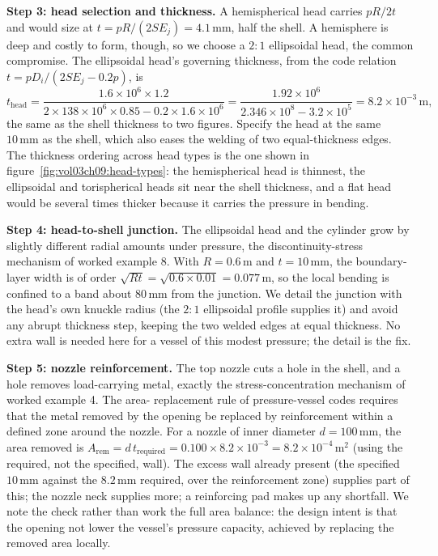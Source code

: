\textbf{Step 3: head selection and thickness.} A hemispherical head
carries $pR/2t$ and would size at $t = pR/(2 S E_j) = 4.1\,\si{
\milli\meter}$, half the shell. A hemisphere is deep and costly to
form, though, so we choose a $2{:}1$ ellipsoidal head, the common
compromise. The ellipsoidal head's governing thickness, from the code
relation $t = pD_i/(2 S E_j - 0.2 p)$, is
\[
t_{\text{head}} = \frac{1.6\times 10^6\times 1.2}
{2\times 138\times 10^6\times 0.85 - 0.2\times 1.6\times 10^6}
= \frac{1.92\times 10^6}{2.346\times 10^8 - 3.2\times 10^5}
= 8.2\times 10^{-3}\,\text{m},
\]
the same as the shell thickness to two figures. Specify the head at the same
$10\,\si{\milli\meter}$ as the shell, which also eases the welding of
two equal-thickness edges. The thickness ordering across head types is
the one shown in figure~\ref{fig:vol03ch09:head-types}: the
hemispherical head is thinnest, the ellipsoidal and torispherical heads
sit near the shell thickness, and a flat head would be several times
thicker because it carries the pressure in bending.



\textbf{Step 4: head-to-shell junction.} The ellipsoidal head and the
cylinder grow by slightly different radial amounts under pressure, the
discontinuity-stress mechanism of worked example 8. With $R = 0.6\,
\si{\meter}$ and $t = 10\,\si{\milli\meter}$, the boundary-layer width
is of order $\sqrt{R t} = \sqrt{0.6\times 0.01} = 0.077\,\si{\meter}$,
so the local bending is confined to a band about $80\,\si{\milli\meter}$
from the junction. We detail the junction with the head's own knuckle
radius (the $2{:}1$ ellipsoidal profile supplies it) and avoid any
abrupt thickness step, keeping the two welded edges at equal thickness.
No extra wall is needed here for a vessel of this modest pressure; the
detail is the fix.

\textbf{Step 5: nozzle reinforcement.} The top nozzle cuts a hole in
the shell, and a hole removes load-carrying metal, exactly the
stress-concentration mechanism of worked example 4. The area-
replacement rule of pressure-vessel codes requires that the metal
removed by the opening be replaced by reinforcement within a defined
zone around the nozzle. For a nozzle of inner diameter $d = 100\,
\si{\milli\meter}$, the area removed is $A_{\text{rem}} = d\,t_{\text{
required}} = 0.100\times 8.2\times 10^{-3} = 8.2\times 10^{-4}\,
\text{m}^2$ (using the required, not the specified, wall). The excess
wall already present (the specified $10\,\si{\milli\meter}$ against the
$8.2\,\si{\milli\meter}$ required, over the reinforcement zone) supplies
part of this; the nozzle neck supplies more; a reinforcing pad makes up
any shortfall. We note the check rather than work the full area
balance: the design intent is that the opening not lower the vessel's
pressure capacity, achieved by replacing the removed area locally.


